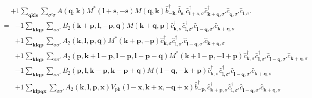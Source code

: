 \begin{align*}
	&+1 \sum_{ \mathbf{q} \mathbf{k} \mathbf{l} \mathbf{s} } \sum_{ \sigma' \sigma } A( \mathbf{q}, \mathbf{k} )  M^*( \mathbf{l}+\mathbf{s}, -\mathbf{s} )  M( \mathbf{q}, \mathbf{k} )   \hat{b}_{ -\mathbf{k}, }^\dagger  \hat{b}_{ \mathbf{s}, }^{\phantom{\dagger}} \hat{c}_{ \mathbf{l}+\mathbf{s}, \sigma }^\dagger  \hat{c}_{ \mathbf{k}+\mathbf{q}, \sigma' }^\dagger  \hat{c}_{ \mathbf{q}, \sigma' }^{\phantom{\dagger}} \hat{c}_{ \mathbf{l}, \sigma }^{\phantom{\dagger}} 
. \end{align*}
\begin{align*}
	[\eta', H] = 	&-1 \sum_{ \mathbf{k} \mathbf{l} \mathbf{q} \mathbf{p} } \sum_{ \sigma \sigma' } B_2( \mathbf{k}+\mathbf{p}, \mathbf{l}, -\mathbf{p}, \mathbf{q} )  M( \mathbf{k}+\mathbf{q}, \mathbf{p} )   \hat{c}_{ \mathbf{k}, \sigma }^\dagger  \hat{c}_{ \mathbf{l}, \sigma' }^\dagger  \hat{c}_{ \mathbf{l}-\mathbf{q}, \sigma' }^{\phantom{\dagger}} \hat{c}_{ \mathbf{k}+\mathbf{q}, \sigma }^{\phantom{\dagger}}  \\
	&+1 \sum_{ \mathbf{k} \mathbf{l} \mathbf{q} \mathbf{p} } \sum_{ \sigma \sigma' } A_2( \mathbf{k}, \mathbf{l}, \mathbf{p}, \mathbf{q} )  M^*( \mathbf{k}+\mathbf{p}, -\mathbf{p} )   \hat{c}_{ \mathbf{k}, \sigma }^\dagger  \hat{c}_{ \mathbf{l}, \sigma' }^\dagger  \hat{c}_{ \mathbf{l}-\mathbf{q}, \sigma' }^{\phantom{\dagger}} \hat{c}_{ \mathbf{k}+\mathbf{q}, \sigma }^{\phantom{\dagger}}  \\
	&+1 \sum_{ \mathbf{k} \mathbf{l} \mathbf{q} \mathbf{p} } \sum_{ \sigma \sigma' } A_2( \mathbf{p}, \mathbf{k}+\mathbf{l}-\mathbf{p}, \mathbf{l}-\mathbf{p}, \mathbf{l}-\mathbf{p}-\mathbf{q} )  M^*( \mathbf{k}+\mathbf{l}-\mathbf{p}, -\mathbf{l}+\mathbf{p} )   \hat{c}_{ \mathbf{k}, \sigma }^\dagger  \hat{c}_{ \mathbf{l}, \sigma' }^\dagger  \hat{c}_{ \mathbf{l}-\mathbf{q}, \sigma' }^{\phantom{\dagger}} \hat{c}_{ \mathbf{k}+\mathbf{q}, \sigma }^{\phantom{\dagger}}  \\
	&-1 \sum_{ \mathbf{k} \mathbf{l} \mathbf{q} \mathbf{p} } \sum_{ \sigma \sigma' } B_2( \mathbf{p}, \mathbf{l}, \mathbf{k}-\mathbf{p}, \mathbf{k}-\mathbf{p}+\mathbf{q} )  M( \mathbf{l}-\mathbf{q}, -\mathbf{k}+\mathbf{p} )   \hat{c}_{ \mathbf{k}, \sigma }^\dagger  \hat{c}_{ \mathbf{l}, \sigma' }^\dagger  \hat{c}_{ \mathbf{l}-\mathbf{q}, \sigma' }^{\phantom{\dagger}} \hat{c}_{ \mathbf{k}+\mathbf{q}, \sigma }^{\phantom{\dagger}}  \\
	&+1 \sum_{ \mathbf{k} \mathbf{l} \mathbf{p} \mathbf{q} \mathbf{x} } \sum_{ \sigma \sigma' } A_2( \mathbf{k}, \mathbf{l}, \mathbf{p}, \mathbf{x} )  V_\mathrm{ph}( \mathbf{l}-\mathbf{x}, \mathbf{k}+\mathbf{x}, -\mathbf{q}+\mathbf{x} )   \hat{b}_{ -\mathbf{p}, }^\dagger  \hat{c}_{ \mathbf{k}+\mathbf{p}, \sigma }^\dagger  \hat{c}_{ \mathbf{l}, \sigma' }^\dagger  \hat{c}_{ \mathbf{l}-\mathbf{q}, \sigma' }^{\phantom{\dagger}} \hat{c}_{ \mathbf{k}+\mathbf{q}, \sigma }^{\phantom{\dagger}}  \\

\end{align*}
